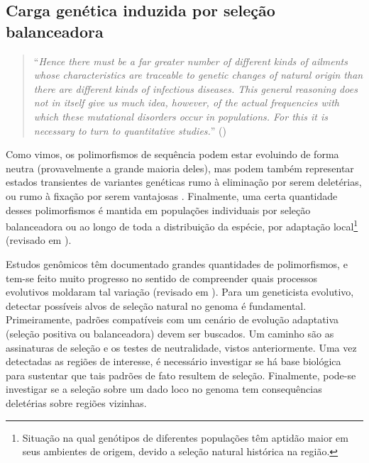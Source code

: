 \begin{refsection}
\section{Carga genética induzida por seleção balanceadora}  


\begin{quotation}
\enquote{\emph{Hence there must be a far greater number of different kinds of ailments whose characteristics are traceable to genetic changes of natural origin than there are different kinds of infectious diseases. This general reasoning does not in itself give us much idea, however, of the actual frequencies with which these mutational disorders occur in populations. For this it is necessary to turn to quantitative studies.}} (\cite{Muller1950})  %
\end{quotation}


Como vimos, os polimorfismos de sequência podem estar evoluindo de forma neutra (provavelmente a grande maioria deles), mas podem também representar estados transientes de variantes genéticas rumo à eliminação por serem deletérias, ou rumo à fixação por serem vantajosas \parencite{Hudson1987,Mitchell-Olds2007,Sellis2011a}. Finalmente, uma certa quantidade desses polimorfismos é mantida em populações individuais por seleção balanceadora ou ao longo de toda a distribuição da espécie, por adaptação local\footnote{Situação na qual genótipos de diferentes populações têm aptidão maior em seus ambientes de origem, devido a seleção natural histórica na região.} (revisado em \cite{Mitchell-Olds2007}).

Estudos genômicos têm documentado grandes quantidades de polimorfismos, e tem-se feito muito progresso no sentido de compreender quais processos evolutivos moldaram tal variação (revisado em \cite{Mitchell-Olds2007}). Para um geneticista evolutivo, detectar possíveis alvos de seleção natural no genoma é fundamental. Primeiramente, padrões compatíveis com um cenário de evolução adaptativa (seleção positiva ou balanceadora) devem ser buscados. Um caminho são as assinaturas de seleção e os testes de neutralidade, vistos anteriormente. Uma vez detectadas as regiões de interesse, é necessário investigar se há base biológica para sustentar que tais padrões de fato resultem de seleção. Finalmente, pode-se investigar se a seleção sobre um dado loco no genoma tem consequências deletérias sobre regiões vizinhas.


\end{refsection}
